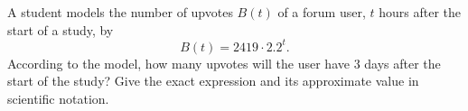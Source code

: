 A student models the number of upvotes $B(t)$ of a forum user, $t$ hours after the start of a study, by
\[B(t)=2419\cdot2.2^{t}.\]
According to the model, how many upvotes will the user have $3$ days after the start of the study? Give the exact expression and its approximate value in scientific notation.
